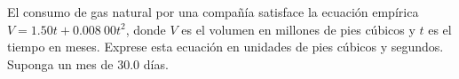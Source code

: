 \item El consumo de gas natural por una compañía satisface la ecuación empírica $V = 1.50t + 0.008\ 00t^2$, donde $V$ es el volumen en millones de pies cúbicos y $t$ es el tiempo en meses. Exprese esta ecuación en unidades de pies cúbicos y segundos. Suponga un mes de $30.0$ días.
